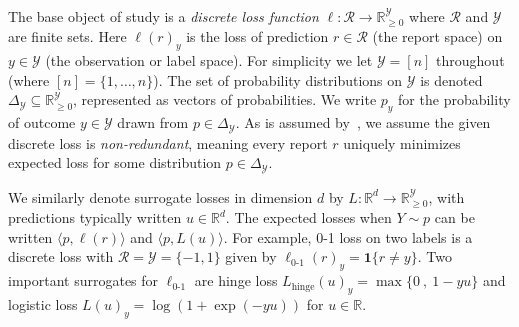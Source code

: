 \documentclass[final]{colt2020} %
\newcommand{\reals}{\mathbb{R}}
\newcommand{\nonnegreals}{\reals_{\geq 0}}%
\newcommand{\simplex}{\Delta_\Y}
\newcommand{\R}{\mathcal{R}}
\newcommand{\Y}{\mathcal{Y}}
\newcommand{\hinge}{L_{\mathrm{hinge}}}
\newcommand{\ellzo}{\ell_{\text{0-1}}}
\newcommand{\inprod}[2]{\langle #1, #2 \rangle}%
\newcommand{\Ind}[1]{\mathbf{1}\{#1\}}
\begin{document}
The base object of study is a \emph{discrete loss function} $\ell: \R \to \nonnegreals^{\Y}$ where $\R$ and $\Y$ are finite sets.
Here $\ell(r)_y$ is the loss of prediction $r \in \R$ (the report space) on $y \in \Y$ (the observation or label space).
For simplicity we let $\Y = [n]$ throughout (where $[n] = \{1,\ldots,n\}$).
The set of probability distributions on $\Y$ is denoted $\simplex\subseteq\nonnegreals^{\Y}$, represented as vectors of probabilities.
We write $p_y$ for the probability of outcome $y \in \Y$ drawn from $p \in \simplex$.
As is assumed by~\citet{finocchiaro2019embedding}, we assume the given discrete loss is \emph{non-redundant}, meaning every report $r$ uniquely minimizes expected loss for some distribution $p\in\simplex$.

We similarly denote surrogate losses in dimension $d$ by $L:\reals^d\to\nonnegreals^{\Y}$, with predictions typically written $u\in\reals^d$.
The expected losses when $Y \sim p$ can be written $\inprod{p}{\ell(r)}$ and $\inprod{p}{L(u)}$.
For example, 0-1 loss on two labels is a discrete loss with $\R = \Y = \{-1,1\}$
given by $\ellzo(r)_y = \Ind{r \neq y}$.
Two important surrogates for $\ellzo$ are hinge loss $\hinge(u)_y = \max\{ 0 ~,~ 1-yu \}$ and logistic loss $L(u)_y = \log(1+\exp(-yu))$ for $u\in\reals$.
\end{document}
